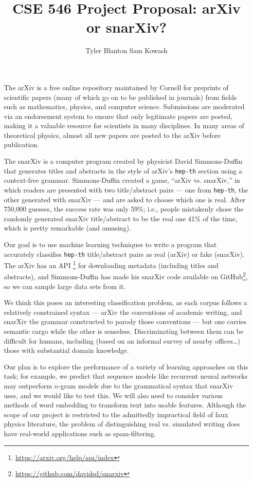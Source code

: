 \documentclass[10pt,letterpaper]{article}
\author{Tyler Blanton \quad Sam Kowash}
\title{CSE 546 Project Proposal: arXiv or snarXiv?}
\numberwithin{equation}{section}
\numberwithin{figure}{section}
\begin{document}
\maketitle
The arXiv is a free online repository maintained by Cornell for preprints of scientific papers (many of which go on to be published in journals) from fields such as mathematics, physics, and computer science.
Submissions are moderated via an endorsement system to ensure that only legitimate papers are posted, making it a valuable resource for scientists in many disciplines. In many areas of theoretical physics, almost all new papers are posted to the arXiv before publication.

The snarXiv is a computer program created by physicist David Simmons-Duffin that generates titles and abstracts in the style of arXiv's \texttt{hep-th} section using a context-free grammar.
Simmons-Duffin created a game, ``arXiv vs. snarXiv,'' in which readers are presented with two title/abstract pairs --- one from \texttt{hep-th}, the other generated with snarXiv --- and are asked to choose which one is real.
After 750,000 guesses, the success rate was only 59\%; i.e., people mistakenly chose the randomly generated snarXiv title/abstract to be the real one 41\% of the time, which is pretty remarkable (and amusing).

Our goal is to use machine learning techniques to write a program that accurately classifies \texttt{hep-th} title/abstract pairs as real (arXiv) or fake (snarXiv).
The arXiv has an API%
\footnote{\url{https://arxiv.org/help/api/index}}
for downloading metadata (including titles and abstracts), and Simmons-Duffin has made his snarXiv code available on GitHub\footnote{\url{https://github.com/davidsd/snarxiv}}, so we can sample large data sets from it.
%

We think this poses an interesting classification problem, as each corpus follows a relatively constrained syntax --- arXiv the conventions of academic writing, and snarXiv the grammar constructed to parody those conventions --- but one carries semantic cargo while the other is senseless. Discriminating between them can be difficult for humans, including (based on an informal survey of nearby offices\ldots) those with substantial domain knowledge.

Our plan is to explore the performance of a variety of learning approaches on this task; for example, we predict that sequence models like recurrent neural networks may outperform $n$-gram models due to the grammatical syntax that snarXiv uses, and we would like to test this. 
We will also need to consider various methods of word embedding to transform text into usable features.
Although the scope of our project is restricted to the admittedly impractical field of faux physics literature, the problem of distinguishing real vs. simulated writing does have real-world applications such as spam-filtering. 
\end{document}
